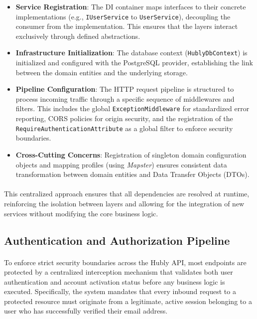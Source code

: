 \begin{itemize}
    \item \textbf{Service Registration}: The DI container maps interfaces to their concrete implementations (e.g., \texttt{IUserService} to \texttt{UserService}), decoupling the consumer from the implementation. This ensures that the layers interact exclusively through defined abstractions.
    
    \item \textbf{Infrastructure Initialization}: The database context (\texttt{HublyDbContext}) is initialized and configured with the PostgreSQL provider, establishing the link between the domain entities and the underlying storage.
    
    \item \textbf{Pipeline Configuration}: The HTTP request pipeline is structured to process incoming traffic through a specific sequence of middlewares and filters. This includes the global \texttt{ExceptionMiddleware} for standardized error reporting, CORS policies for origin security, and the registration of the \texttt{RequireAuthenticationAttribute} as a global filter to enforce security boundaries.
    
    \item \textbf{Cross-Cutting Concerns}: Registration of singleton domain configuration objects and mapping profiles (using \textit{Mapster}) ensures consistent data transformation between domain entities and Data Transfer Objects (DTOs).
\end{itemize}

\paragraph{} This centralized approach ensures that all dependencies are resolved at runtime, reinforcing the isolation between layers and allowing for the integration of new services without modifying the core business logic.


\subsection{Authentication and Authorization Pipeline} \label{subsec:auth_pipeline}

\paragraph{}To enforce strict security boundaries across the Hubly API, most endpoints are protected by a centralized interception mechanism that validates both user authentication and account activation status before any business logic is executed. Specifically, the system mandates that every inbound request to a protected resource must originate from a legitimate, active session belonging to a user who has successfully verified their email address.
